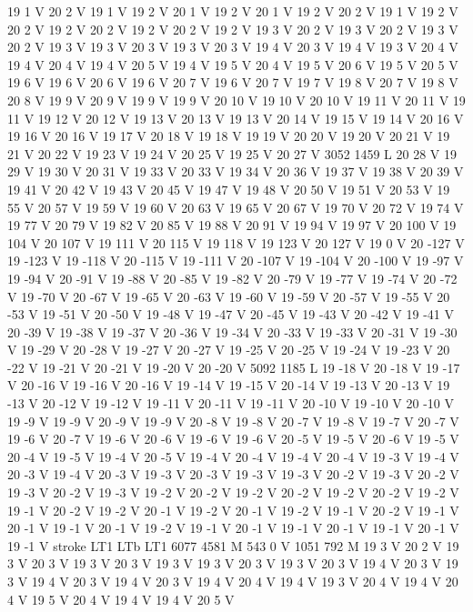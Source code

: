 {{19 1 V
20 2 V
19 1 V
19 2 V
20 1 V
19 2 V
20 1 V
19 2 V
20 2 V
19 1 V
19 2 V
20 2 V
19 2 V
20 2 V
19 2 V
20 2 V
19 2 V
19 3 V
20 2 V
19 3 V
20 2 V
19 3 V
20 2 V
19 3 V
19 3 V
20 3 V
19 3 V
20 3 V
19 4 V
20 3 V
19 4 V
19 3 V
20 4 V
19 4 V
20 4 V
19 4 V
20 5 V
19 4 V
19 5 V
20 4 V
19 5 V
20 6 V
19 5 V
20 5 V
19 6 V
19 6 V
20 6 V
19 6 V
20 7 V
19 6 V
20 7 V
19 7 V
19 8 V
20 7 V
19 8 V
20 8 V
19 9 V
20 9 V
19 9 V
19 9 V
20 10 V
19 10 V
20 10 V
19 11 V
20 11 V
19 11 V
19 12 V
20 12 V
19 13 V
20 13 V
19 13 V
20 14 V
19 15 V
19 14 V
20 16 V
19 16 V
20 16 V
19 17 V
20 18 V
19 18 V
19 19 V
20 20 V
19 20 V
20 21 V
19 21 V
20 22 V
19 23 V
19 24 V
20 25 V
19 25 V
20 27 V
3052 1459 L
20 28 V
19 29 V
19 30 V
20 31 V
19 33 V
20 33 V
19 34 V
20 36 V
19 37 V
19 38 V
20 39 V
19 41 V
20 42 V
19 43 V
20 45 V
19 47 V
19 48 V
20 50 V
19 51 V
20 53 V
19 55 V
20 57 V
19 59 V
19 60 V
20 63 V
19 65 V
20 67 V
19 70 V
20 72 V
19 74 V
19 77 V
20 79 V
19 82 V
20 85 V
19 88 V
20 91 V
19 94 V
19 97 V
20 100 V
19 104 V
20 107 V
19 111 V
20 115 V
19 118 V
19 123 V
20 127 V
19 0 V
20 -127 V
19 -123 V
19 -118 V
20 -115 V
19 -111 V
20 -107 V
19 -104 V
20 -100 V
19 -97 V
19 -94 V
20 -91 V
19 -88 V
20 -85 V
19 -82 V
20 -79 V
19 -77 V
19 -74 V
20 -72 V
19 -70 V
20 -67 V
19 -65 V
20 -63 V
19 -60 V
19 -59 V
20 -57 V
19 -55 V
20 -53 V
19 -51 V
20 -50 V
19 -48 V
19 -47 V
20 -45 V
19 -43 V
20 -42 V
19 -41 V
20 -39 V
19 -38 V
19 -37 V
20 -36 V
19 -34 V
20 -33 V
19 -33 V
20 -31 V
19 -30 V
19 -29 V
20 -28 V
19 -27 V
20 -27 V
19 -25 V
20 -25 V
19 -24 V
19 -23 V
20 -22 V
19 -21 V
20 -21 V
19 -20 V
20 -20 V
5092 1185 L
19 -18 V
20 -18 V
19 -17 V
20 -16 V
19 -16 V
20 -16 V
19 -14 V
19 -15 V
20 -14 V
19 -13 V
20 -13 V
19 -13 V
20 -12 V
19 -12 V
19 -11 V
20 -11 V
19 -11 V
20 -10 V
19 -10 V
20 -10 V
19 -9 V
19 -9 V
20 -9 V
19 -9 V
20 -8 V
19 -8 V
20 -7 V
19 -8 V
19 -7 V
20 -7 V
19 -6 V
20 -7 V
19 -6 V
20 -6 V
19 -6 V
19 -6 V
20 -5 V
19 -5 V
20 -6 V
19 -5 V
20 -4 V
19 -5 V
19 -4 V
20 -5 V
19 -4 V
20 -4 V
19 -4 V
20 -4 V
19 -3 V
19 -4 V
20 -3 V
19 -4 V
20 -3 V
19 -3 V
20 -3 V
19 -3 V
19 -3 V
20 -2 V
19 -3 V
20 -2 V
19 -3 V
20 -2 V
19 -3 V
19 -2 V
20 -2 V
19 -2 V
20 -2 V
19 -2 V
20 -2 V
19 -2 V
19 -1 V
20 -2 V
19 -2 V
20 -1 V
19 -2 V
20 -1 V
19 -2 V
19 -1 V
20 -2 V
19 -1 V
20 -1 V
19 -1 V
20 -1 V
19 -2 V
19 -1 V
20 -1 V
19 -1 V
20 -1 V
19 -1 V
20 -1 V
19 -1 V
stroke
LT1
LTb
LT1
6077 4581 M
543 0 V
1051 792 M
19 3 V
20 2 V
19 3 V
20 3 V
19 3 V
20 3 V
19 3 V
19 3 V
20 3 V
19 3 V
20 3 V
19 4 V
20 3 V
19 3 V
19 4 V
20 3 V
19 4 V
20 3 V
19 4 V
20 4 V
19 4 V
19 3 V
20 4 V
19 4 V
20 4 V
19 5 V
20 4 V
19 4 V
19 4 V
20 5 V
}}
